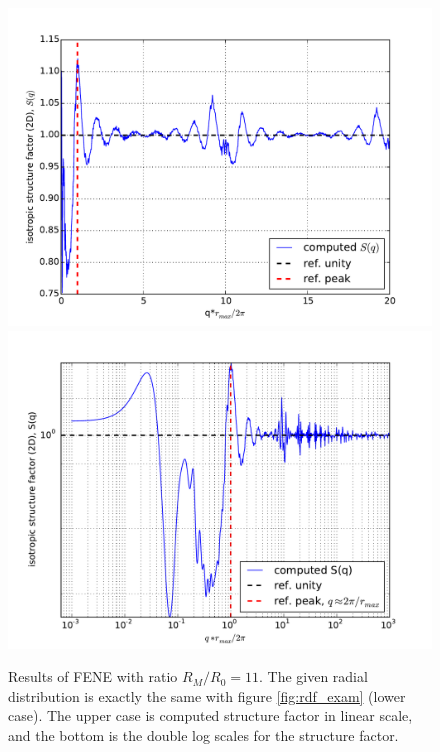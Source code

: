 \documentclass[10pt, a4paper]{report}
\begin{document}
\begin{appendices}
    \begin{figure}
      \centering
      \includegraphics[width=\textwidth]{figures/FENE_r11_Sq_linear.pdf}\\
      \includegraphics[width=\textwidth]{figures/FENE_r11_Sq_log.pdf}
      \caption{Results of FENE with ratio $R_M/R_0=11$. The given radial distribution is exactly the same with figure \ref{fig:rdf_exam} (lower case). The upper case is computed structure factor in linear scale, and the bottom is the double log scales for the structure factor.}
      \label{fig:2d_Sq}
    \end{figure}


\end{appendices}
\end{document}
